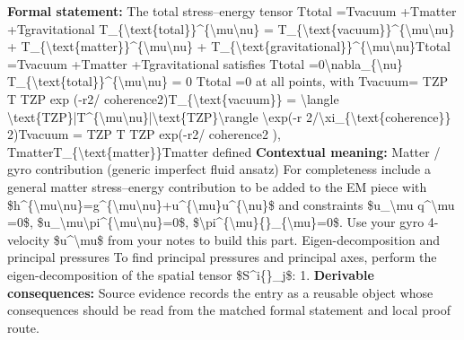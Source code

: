 \begingroup\footnotesize\setlength{\emergencystretch}{3em}\sloppy
\textbf{Formal statement:} The total stress--energy tensor Ttotal  =Tvacuum  +Tmatter  +Tgravitational  T\_\{\textbackslash{}text\{total\}\}\textasciicircum{}\{\textbackslash{}mu\textbackslash{}nu\} = T\_\{\textbackslash{}text\{vacuum\}\}\textasciicircum{}\{\textbackslash{}mu\textbackslash{}nu\} + T\_\{\textbackslash{}text\{matter\}\}\textasciicircum{}\{\textbackslash{}mu\textbackslash{}nu\} + T\_\{\textbackslash{}text\{gravitational\}\}\textasciicircum{}\{\textbackslash{}mu\textbackslash{}nu\}Ttotal   =Tvacuum   +Tmatter   +Tgravitational   satisfies   Ttotal  =0\textbackslash{}nabla\_\{\textbackslash{}nu\} T\_\{\textbackslash{}text\{total\}\}\textasciicircum{}\{\textbackslash{}mu\textbackslash{}nu\} = 0   Ttotal   =0 at all points, with Tvacuum= TZP T   TZP exp (-r2/ coherence2)T\_\{\textbackslash{}text\{vacuum\}\} = \textbackslash{}langle \textbackslash{}text\{TZP\}|T\textasciicircum{}\{\textbackslash{}mu\textbackslash{}nu\}|\textbackslash{}text\{TZP\}\textbackslash{}rangle \textbackslash{}exp(-r 2/\textbackslash{}xi\_\{\textbackslash{}text\{coherence\}\} 2)Tvacuum = TZP T   TZP exp(-r2/ coherence2 ), TmatterT\_\{\textbackslash{}text\{matter\}\}Tmatter defined
\textbf{Contextual meaning:} Matter / gyro contribution (generic imperfect fluid ansatz) For completeness include a general matter stress--energy contribution to be added to the EM piece with \$h\textasciicircum{}\{\textbackslash{}mu\textbackslash{}nu\}=g\textasciicircum{}\{\textbackslash{}mu\textbackslash{}nu\}+u\textasciicircum{}\{\textbackslash{}mu\}u\textasciicircum{}\{\textbackslash{}nu\}\$ and constraints \$u\_\textbackslash{}mu q\textasciicircum{}\textbackslash{}mu =0\$, \$u\_\textbackslash{}mu\textbackslash{}pi\textasciicircum{}\{\textbackslash{}mu\textbackslash{}nu\}=0\$, \$\textbackslash{}pi\textasciicircum{}\{\textbackslash{}mu\}\{\}\_\{\textbackslash{}mu\}=0\$. Use your gyro 4-velocity \$u\textasciicircum{}\textbackslash{}mu\$ from your notes to build this part. Eigen-decomposition and principal pressures To find principal pressures and principal axes, perform the eigen-decomposition of the spatial tensor \$S\textasciicircum{}i\{\}\_j\$: 1.
\textbf{Derivable consequences:} Source evidence records the entry as a reusable object whose consequences should be read from the matched formal statement and local proof route.
